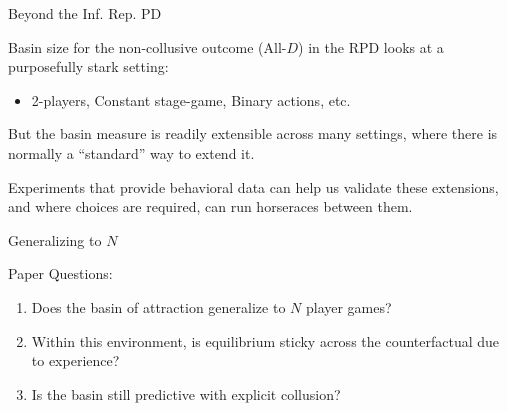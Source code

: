 \documentclass[english]{beamer}
\begin{document}
\begin{frame}{Beyond the Inf. Rep. PD}
\begin{card}
Basin size for the non-collusive outcome (All-$D$) in the RPD looks at a purposefully stark setting:
 \begin{itemize}
     \item 2-players,  Constant stage-game,  Binary actions, etc. 
 \end{itemize}
\end{card}
 
\begin{card} But the basin measure is readily extensible across many settings, where there is normally a ``standard'' way to extend it. 
 
Experiments that provide behavioral data can help us validate these extensions, and where choices are required, can run horseraces between them. \end{card} 

\end{frame}


\begin{frame}{Generalizing to $N$}
\begin{card}{Paper Questions:}
    \begin{enumerate}
        \item Does the basin of attraction generalize to $N$ player games?
        \item Within this environment, is equilibrium sticky across the counterfactual due to experience?
        \item Is the basin still predictive with explicit collusion?
    \end{enumerate}
\end{card}
\end{frame}
\end{document}
